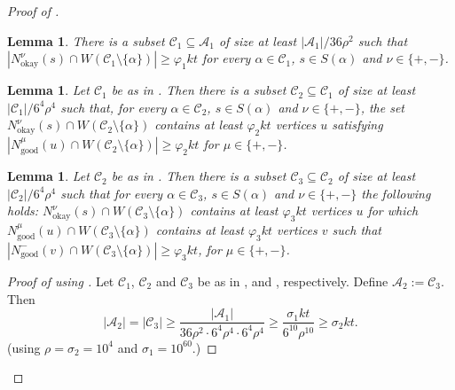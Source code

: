 \documentclass[english]{article}
\theoremstyle{plain}
\newtheorem{lemma}[theorem]{Lemma}
\theoremstyle{remark}
\def\C{\mathcal{C}}
\let\phi\varphi
\def \Nmu{N^{\mu}_{\good}}
\def \Nnuo{N^{\nu}_{\okay}}
\def \Nmg{N^-_{\good}}
\newcommand{\A}{\mathcal{A}}
\DeclareMathOperator{\good}{good}
\DeclareMathOperator{\okay}{okay}
\begin{document}
\begin{proof}[Proof of ]
		\begin{lemma} \label{lem:available-step-1}
			There is a subset $\C_1 \subseteq \A_1$ of size at least $|\A_1|/36\rho^2$ such that $|\Nnuo(s) \cap W(\C_1 \setminus \{\alpha\})| \ge \phi_1 kt$ for every $\alpha \in \C_1$, $s \in S(\alpha)$ and $\nu \in \{+, -\}$.
		\end{lemma}

		\begin{lemma} \label{lem:available-step-2}
			Let $\C_1$ be as in . Then there is a subset $\C_2 \subseteq \C_1$ of size at least $|\C_1| / 6^4\rho^4$ such that, for every $\alpha \in \C_2$, $s \in S(\alpha)$ and $\nu \in \{+, -\}$, the set $\Nnuo(s) \cap W(\C_2 \setminus \{\alpha\})$ contains at least $\phi_2 kt$ vertices $u$ satisfying $|\Nmu(u) \cap W(\C_2 \setminus \{\alpha\})| \ge \phi_2 kt$ for $\mu \in \{+, -\}$.
		\end{lemma}

		\begin{lemma} \label{lem:available-step-3}
			Let $\C_2$ be as in .
			Then there is a subset $\C_3 \subseteq \C_2$ of size at least $|\C_2|/6^4\rho^4$ such that for every $\alpha \in \C_3$, $s \in S(\alpha)$ and $\nu \in \{+, -\}$ the following holds: $\Nnuo(s) \cap W(\C_3 \setminus \{\alpha\})$ contains at least $\phi_3 kt$ vertices $u$ for which $\Nmu(u) \cap W(\C_3 \setminus \{\alpha\})$ contains at least $\phi_3 kt$ vertices $v$ such that $|\Nmg(v) \cap W(\C_3 \setminus \{\alpha\})| \ge \phi_3 kt$, for $\mu \in \{+, -\}$.
		\end{lemma}

		\begin{proof}[Proof of  using ]
			Let $\C_1$, $\C_2$ and $\C_3$ be as in ,  and , respectively. Define $\A_2 := \C_3$.
			Then 
			\begin{equation*}
				|\A_2| 
				= |\C_3| 
				\ge \frac{|\A_1|}{36\rho^2 \cdot 6^4\rho^4 \cdot 6^4\rho^4} 
				\ge \frac{\sigma_1 kt}{6^{10} \rho^{10}}
				\ge \sigma_2 kt.
			\end{equation*}
			(using $\rho = \sigma_2 = 10^4$ and $\sigma_1 = 10^{60}$.)


\end{proof}
\end{proof}
\end{document}
